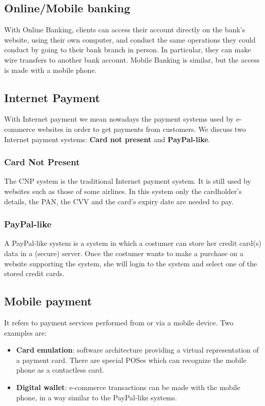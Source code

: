 \documentclass[a4paper, 10pt, titlepage]{article}
\begin{document}
\subsection{Online/Mobile banking}
With Online Banking, clients can access their account directly on the bank's website, using their own computer, and conduct the same operations they could conduct by going to their bank branch in person. In particular, they can make wire transfers to another bank account. Mobile Banking is similar, but the access is made with a mobile phone.

\subsection{Internet Payment}
With Internet payment we mean nowadays the payment systems used by e-commerce websites in order to get payments from customers. We discuss two Internet payment systems: \textbf{Card not present} and \textbf{PayPal-like}.

\subsubsection{Card Not Present}
The CNP system is the traditional Internet payment system. It is still used by websites such as those of some airlines. In this system only the cardholder's details, the PAN, the CVV and the card's expiry date are needed to pay.

\subsubsection{PayPal-like}
A PayPal-like system is a system in which a costumer can store her credit card(s) data in a (secure) server. Once the costumer wants to make a purchase on a website supporting the system, she will login to the system and select one of the stored credit cards. 

\subsection{Mobile payment}
It refers to payment services performed from or via a mobile device. Two examples are:
\begin{itemize}
\item \textbf{Card emulation}: software architecture providing a virtual representation of a payment card. There are special POSes which can recognize the mobile phone as a contactless card.
\item \textbf{Digital wallet}: e-commerce transactions can be made with the mobile phone, in a way similar to the PayPal-like systems.
\end{itemize}
\end{document}
